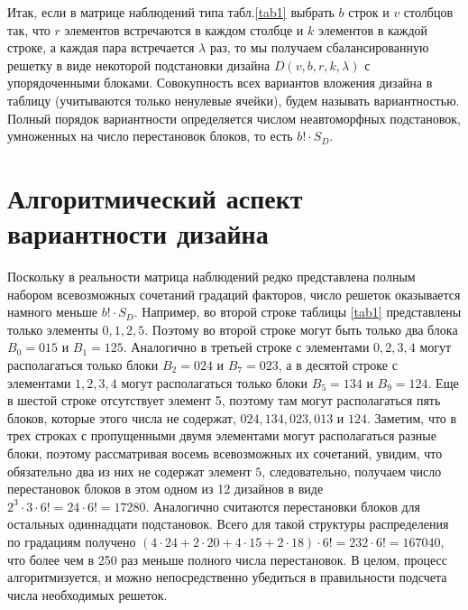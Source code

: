 \documentclass{math-mech-sci}
\begin{document}
Итак, если в  матрице наблюдений типа табл.\ref{tab1} выбрать   $b$ строк и $v$ столбцов так, что   $r$ элементов встречаются  в каждом столбце и $k$ элементов в каждой строке, а каждая пара встречается $\lambda$  раз, то мы получаем сбалансированную решетку в виде некоторой подстановки дизайна $D(v,b,r,k,\lambda)$ с упорядоченными блоками. Совокупность всех вариантов вложения дизайна в таблицу (учитываются только ненулевые ячейки), будем называть вариантностью. Полный порядок  вариантности  определяется числом неавтоморфных подстановок, умноженных на число перестановок блоков, то есть $b! \cdot S_D$. 


\section{Алгоритмический аспект  вариантности дизайна}

Поскольку в реальности матрица наблюдений редко представлена полным набором всевозможных сочетаний градаций факторов,  число решеток оказывается намного меньше $b!\cdot S_D$.  Например, во второй строке таблицы \ref{tab1}  представлены только элементы $0,1,2,5$. Поэтому  во второй строке могут быть только два блока $B_0=015$  и  $B_1=125$.   Аналогично в третьей строке с элементами $0,2,3,4$ могут располагаться только блоки  $B_2=024$  и  $B_7=023$, а в десятой строке с элементами $1,2,3,4$ могут располагаться только блоки  $B_5=134$  и  $B_9=124$. Еще в шестой  строке отсутствует элемент 5, поэтому там могут располагаться пять  блоков, которые этого числа не содержат, $024, 134, 023, 013$  и $124$. Заметим, что в трех строках с пропущенными двумя элементами  могут располагаться разные блоки, поэтому рассматривая восемь всевозможных их сочетаний, увидим, что обязательно два из них не содержат элемент  $5$, следовательно, получаем число перестановок блоков в этом одном из 12 дизайнов в виде  $2^3\cdot 3\cdot 6!=24\cdot 6!=17280$. 
Аналогично считаются перестановки блоков для остальных одиннадцати подстановок.
Всего для такой структуры распределения по градациям получено  $(4\cdot 24 +2\cdot 20  +4\cdot  15 +2\cdot 18)\cdot 6!=232\cdot 6!=167040$, что более чем в 250 раз меньше полного числа перестановок. В целом, процесс алгоритмизуется, и можно непосредственно убедиться в правильности подсчета числа необходимых решеток. 
\end{document}
